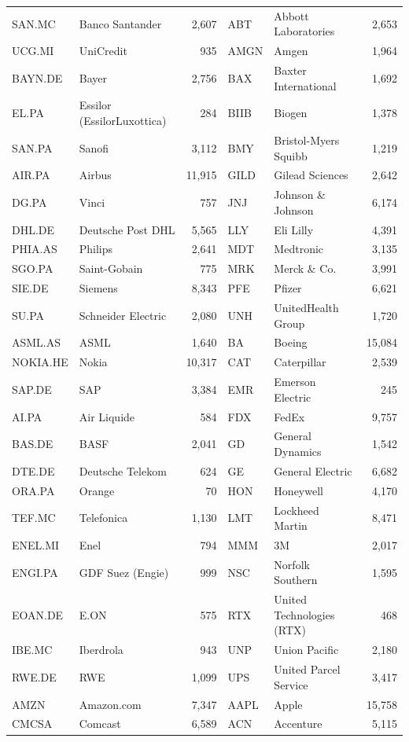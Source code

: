 \begin{tabular}{llrllr}
SAN.MC & Banco Santander & 2,607 & ABT & Abbott Laboratories & 2,653 \\
UCG.MI & UniCredit & 935 & AMGN & Amgen & 1,964 \\
BAYN.DE & Bayer & 2,756 & BAX & Baxter International & 1,692 \\
EL.PA & Essilor (EssilorLuxottica) & 284 & BIIB & Biogen & 1,378 \\
SAN.PA & Sanofi & 3,112 & BMY & Bristol-Myers Squibb & 1,219 \\
AIR.PA & Airbus & 11,915 & GILD & Gilead Sciences & 2,642 \\
DG.PA & Vinci & 757 & JNJ & Johnson \& Johnson & 6,174 \\
DHL.DE & Deutsche Post DHL & 5,565 & LLY & Eli Lilly & 4,391 \\
PHIA.AS & Philips & 2,641 & MDT & Medtronic & 3,135 \\
SGO.PA & Saint-Gobain & 775 & MRK & Merck \& Co. & 3,991 \\
SIE.DE & Siemens & 8,343 & PFE & Pfizer & 6,621 \\
SU.PA & Schneider Electric & 2,080 & UNH & UnitedHealth Group & 1,720 \\
ASML.AS & ASML & 1,640 & BA & Boeing & 15,084 \\
NOKIA.HE & Nokia & 10,317 & CAT & Caterpillar & 2,539 \\
SAP.DE & SAP & 3,384 & EMR & Emerson Electric & 245 \\
AI.PA & Air Liquide & 584 & FDX & FedEx & 9,757 \\
BAS.DE & BASF & 2,041 & GD & General Dynamics & 1,542 \\
DTE.DE & Deutsche Telekom & 624 & GE & General Electric & 6,682 \\
ORA.PA & Orange & 70 & HON & Honeywell & 4,170 \\
TEF.MC & Telefonica & 1,130 & LMT & Lockheed Martin & 8,471 \\
ENEL.MI & Enel & 794 & MMM & 3M & 2,017 \\
ENGI.PA & GDF Suez (Engie) & 999 & NSC & Norfolk Southern & 1,595 \\
EOAN.DE & E.ON & 575 & RTX & United Technologies (RTX) & 468 \\
IBE.MC & Iberdrola & 943 & UNP & Union Pacific & 2,180 \\
RWE.DE & RWE & 1,099 & UPS & United Parcel Service & 3,417 \\
AMZN & Amazon.com & 7,347 & AAPL & Apple & 15,758 \\
CMCSA & Comcast & 6,589 & ACN & Accenture & 5,115 \\

\end{tabular}
